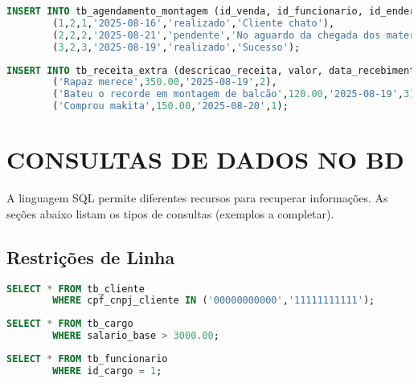 \documentclass[
12pt,
a4paper,
semrecuonosumario,
sumario = abnt-6027-2012]{report}
\begin{document}
    \begin{lstlisting}[language=SQL,caption={DML -- Tabela \texttt{tb\_agendamento\_montagem}}]
        INSERT INTO tb_agendamento_montagem (id_venda, id_funcionario, id_endereco, data, status_montagem, observacao) VALUES
        (1,2,1,'2025-08-16','realizado','Cliente chato'),
        (2,2,2,'2025-08-21','pendente','No aguardo da chegada dos materiais'),
        (3,2,3,'2025-08-19','realizado','Sucesso');
    \end{lstlisting}
    
    \begin{lstlisting}[language=SQL,caption={DML -- Tabela \texttt{tb\_receita\_extra}}]
        INSERT INTO tb_receita_extra (descricao_receita, valor, data_recebimento, id_funcionario) VALUES
        ('Rapaz merece',350.00,'2025-08-19',2),
        ('Bateu o recorde em montagem de balcão',120.00,'2025-08-19',3),
        ('Comprou makita',150.00,'2025-08-20',1);
    \end{lstlisting}


\chapter{CONSULTAS DE DADOS NO BD}\label{chap:consultas}
A linguagem SQL permite diferentes recursos para recuperar informações.
As seções abaixo listam os tipos de consultas (exemplos a completar).
    
    \section{Restrições de Linha}
    
    \begin{lstlisting}[language=SQL,caption={SELECT -- Tabela\texttt{tb\_cliente}}]
        SELECT * FROM tb_cliente
        WHERE cpf_cnpj_cliente IN ('00000000000','11111111111');
    \end{lstlisting}
    
    \begin{lstlisting}[language=SQL,caption={SELECT -- Tabela \texttt{tb\_cargo}}]
        SELECT * FROM tb_cargo
        WHERE salario_base > 3000.00;
    \end{lstlisting}
    
    \begin{lstlisting}[language=SQL,caption={SELECT -- Tabela \texttt{tb\_funcionario}}]
        SELECT * FROM tb_funcionario
        WHERE id_cargo = 1;
    \end{lstlisting}
    
\end{document}
